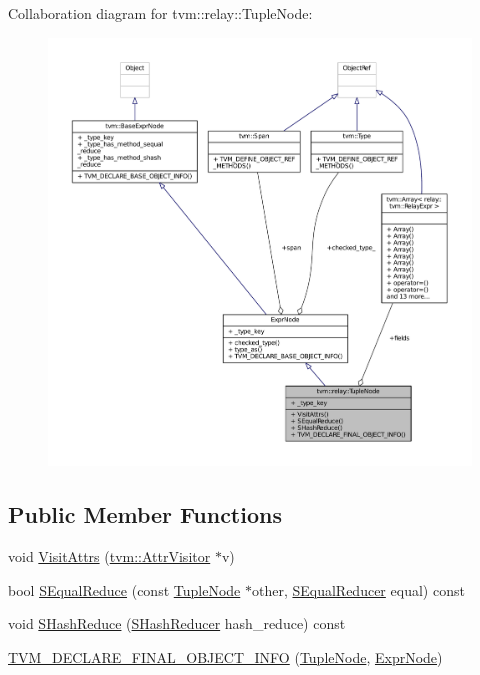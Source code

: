 Collaboration diagram for tvm\+:\+:relay\+:\+:Tuple\+Node\+:
\nopagebreak
\begin{figure}[H]
\begin{center}
\leavevmode
\includegraphics[width=350pt]{classtvm_1_1relay_1_1TupleNode__coll__graph}
\end{center}
\end{figure}
\subsection*{Public Member Functions}
\begin{DoxyCompactItemize}
\item 
void \hyperlink{classtvm_1_1relay_1_1TupleNode_ae9e351b42b8cde177714c98c5d353e29}{Visit\+Attrs} (\hyperlink{classtvm_1_1AttrVisitor}{tvm\+::\+Attr\+Visitor} $\ast$v)
\item 
bool \hyperlink{classtvm_1_1relay_1_1TupleNode_aeeb335ccd239b1b3d033a2ed0bd91b98}{S\+Equal\+Reduce} (const \hyperlink{classtvm_1_1relay_1_1TupleNode}{Tuple\+Node} $\ast$other, \hyperlink{classtvm_1_1SEqualReducer}{S\+Equal\+Reducer} equal) const 
\item 
void \hyperlink{classtvm_1_1relay_1_1TupleNode_a20a24afd2954d105d1ac57ac022fadc1}{S\+Hash\+Reduce} (\hyperlink{classtvm_1_1SHashReducer}{S\+Hash\+Reducer} hash\+\_\+reduce) const 
\item 
\hyperlink{classtvm_1_1relay_1_1TupleNode_ac967e2fd67033e86bf31abddf59d79e5}{T\+V\+M\+\_\+\+D\+E\+C\+L\+A\+R\+E\+\_\+\+F\+I\+N\+A\+L\+\_\+\+O\+B\+J\+E\+C\+T\+\_\+\+I\+N\+FO} (\hyperlink{classtvm_1_1relay_1_1TupleNode}{Tuple\+Node}, \hyperlink{namespacetvm_1_1relay_a387f18e050d016c52ea6c4781e7cff6c}{Expr\+Node})
\end{DoxyCompactItemize}
